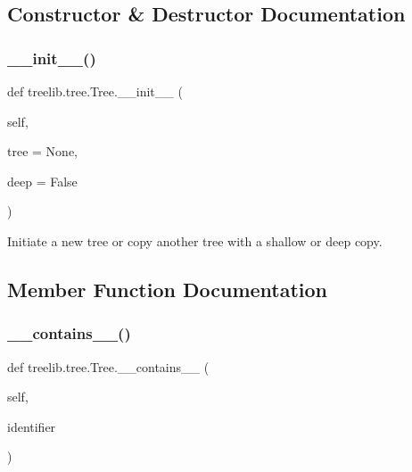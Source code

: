 \subsection{Constructor \& Destructor Documentation}
\mbox{\label{classtreelib_1_1tree_1_1Tree_ab6e19ed5aabb69d4a540bbcfa132fe25}} 
\subsubsection{\texorpdfstring{\+\_\+\+\_\+init\+\_\+\+\_\+()}{\_\_init\_\_()}}
{\footnotesize\ttfamily def treelib.\+tree.\+Tree.\+\_\+\+\_\+init\+\_\+\+\_\+ (\begin{DoxyParamCaption}\item[{}]{self,  }\item[{}]{tree = {\ttfamily None},  }\item[{}]{deep = {\ttfamily False} }\end{DoxyParamCaption})}

\begin{DoxyVerb}Initiate a new tree or copy another tree with a shallow or
deep copy.
\end{DoxyVerb}
 

\subsection{Member Function Documentation}
\mbox{\label{classtreelib_1_1tree_1_1Tree_adb243cbf617b5193f24d53812719f13f}} 
\subsubsection{\texorpdfstring{\+\_\+\+\_\+contains\+\_\+\+\_\+()}{\_\_contains\_\_()}}
{\footnotesize\ttfamily def treelib.\+tree.\+Tree.\+\_\+\+\_\+contains\+\_\+\+\_\+ (\begin{DoxyParamCaption}\item[{}]{self,  }\item[{}]{identifier }\end{DoxyParamCaption})}

